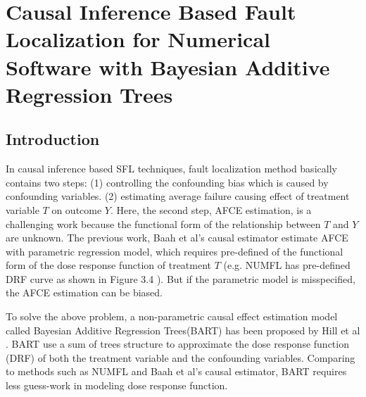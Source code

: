 \chapter{Causal Inference Based Fault Localization for Numerical Software with Bayesian Additive Regression Trees}\label{chap:BART}


\section{Introduction}\label{BARTintro}
\vspace{-2pt}
In causal inference based SFL techniques\cite{bai2015numfl, baah2010causal, baah2011mitigating,shu2013mfl}, fault localization method basically contains two steps: (1) controlling the confounding bias which is caused by confounding variables. (2) estimating average failure causing effect of treatment variable $T$ on outcome $Y$. Here, the second step, AFCE estimation, is a challenging work because the functional form of the relationship between $T$ and $Y$ are unknown. The previous work, Baah et al’s causal estimator estimate AFCE with parametric regression model, which requires pre-defined of the functional form of the dose response function of treatment $T$ (e.g. NUMFL has pre-defined DRF curve as shown in Figure 3.4 ). But if the parametric model is misspecified, the AFCE estimation can be biased.

To solve the above problem, a non-parametric causal effect estimation model called Bayesian Additive Regression Trees(BART) has been proposed by Hill et al \cite{hill2012bayesian}. BART use a sum of trees structure to approximate the dose response function (DRF) of both the treatment variable and the confounding variables. 
Comparing to methods such as NUMFL and Baah et al’s causal estimator, BART requires less guess-work in modeling dose response function.   

